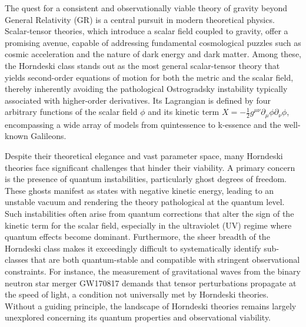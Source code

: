 \documentclass[twocolumn]{aastex631}
\begin{document}
The quest for a consistent and observationally viable theory of gravity beyond General Relativity (GR) is a central pursuit in modern theoretical physics. Scalar-tensor theories, which introduce a scalar field coupled to gravity, offer a promising avenue, capable of addressing fundamental cosmological puzzles such as cosmic acceleration and the nature of dark energy and dark matter. Among these, the Horndeski class stands out as the most general scalar-tensor theory that yields second-order equations of motion for both the metric and the scalar field, thereby inherently avoiding the pathological Ostrogradsky instability typically associated with higher-order derivatives. Its Lagrangian is defined by four arbitrary functions of the scalar field $\phi$ and its kinetic term $X = -\frac{1}{2}g^{\mu\nu}\partial_\mu\phi\partial_\nu\phi$, encompassing a wide array of models from quintessence to k-essence and the well-known Galileons.

Despite their theoretical elegance and vast parameter space, many Horndeski theories face significant challenges that hinder their viability. A primary concern is the presence of quantum instabilities, particularly ghost degrees of freedom. These ghosts manifest as states with negative kinetic energy, leading to an unstable vacuum and rendering the theory pathological at the quantum level. Such instabilities often arise from quantum corrections that alter the sign of the kinetic term for the scalar field, especially in the ultraviolet (UV) regime where quantum effects become dominant. Furthermore, the sheer breadth of the Horndeski class makes it exceedingly difficult to systematically identify sub-classes that are both quantum-stable and compatible with stringent observational constraints. For instance, the measurement of gravitational waves from the binary neutron star merger GW170817 demands that tensor perturbations propagate at the speed of light, a condition not universally met by Horndeski theories. Without a guiding principle, the landscape of Horndeski theories remains largely unexplored concerning its quantum properties and observational viability.
\end{document}
